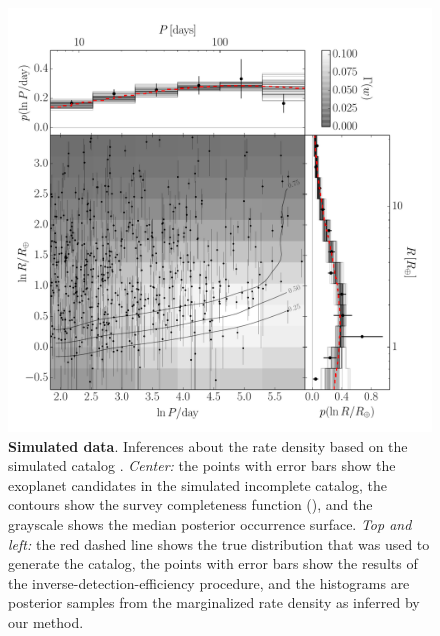\begin{figure}[p]
\begin{center}
\includegraphics[width=\textwidth]{figures/exopop/smooth/results.pdf}
\end{center}
\caption{%
{\bf Simulated data}.
Inferences about the rate density based on the simulated catalog \modela.
\emph{Center:} the points with error bars show the exoplanet candidates in the
simulated incomplete catalog, the contours show the survey completeness
function (\citealt{Petigura:2013}), and the grayscale shows the median posterior
occurrence surface.
\emph{Top and left:} the red dashed line shows the true distribution that was
used to generate the catalog, the points with error bars show the results of
the inverse-detection-efficiency procedure, and the histograms are posterior
samples from the marginalized rate density as inferred by our method.
}
\end{figure}

